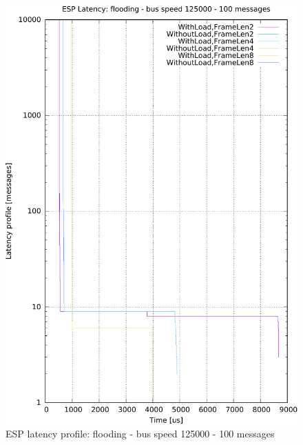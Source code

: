\documentclass{ctuthesis}
\begin{document}
  \begin{figure}[htb]
\includegraphics[width=\linewidth]{figures/speed125000_messages100_floodTrue.pdf}
\caption{ESP latency profile: flooding - bus speed 125000 - 100 messages}
\end{figure}
\end{document}
